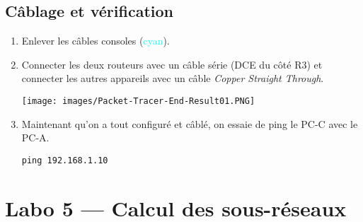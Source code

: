 \documentclass[a4paper]{article}
\begin{document}
\subsection{Câblage et vérification}





\begin{enumerate}



    \item Enlever les câbles consoles (\textcolor{cyan}{cyan}).



    \item Connecter les deux routeurs avec un câble série (DCE du côté R3) et connecter les autres appareils avec un câble \textit{Copper Straight Through}.
    \begin{center}
        \texttt{[image: images/Packet-Tracer-End-Result01.PNG]}
    \end{center}



    \item Maintenant qu'on a tout configuré et câblé, on essaie de ping le PC-C avec le PC-A.
    \begin{example}
        \texttt{ping 192.168.1.10}
    \end{example}



\end{enumerate}















\section{Labo 5 --- Calcul des sous-réseaux}
\end{document}
